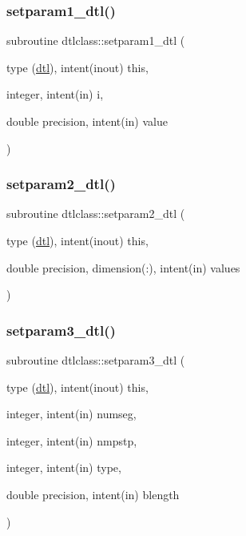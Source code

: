 \subsubsection{\texorpdfstring{setparam1\_dtl()}{setparam1\_dtl()}}
{\footnotesize\ttfamily subroutine dtlclass\+::setparam1\+\_\+dtl (\begin{DoxyParamCaption}\item[{type (\mbox{\hyperlink{namespacedtlclass_structdtlclass_1_1dtl}{dtl}}), intent(inout)}]{this,  }\item[{integer, intent(in)}]{i,  }\item[{double precision, intent(in)}]{value }\end{DoxyParamCaption})}

\mbox{\label{namespacedtlclass_a267abecac3bfad96fd1ce717ba50c8b4}} 
\subsubsection{\texorpdfstring{setparam2\_dtl()}{setparam2\_dtl()}}
{\footnotesize\ttfamily subroutine dtlclass\+::setparam2\+\_\+dtl (\begin{DoxyParamCaption}\item[{type (\mbox{\hyperlink{namespacedtlclass_structdtlclass_1_1dtl}{dtl}}), intent(inout)}]{this,  }\item[{double precision, dimension(\+:), intent(in)}]{values }\end{DoxyParamCaption})}

\mbox{\label{namespacedtlclass_aaccb0362c1862fd4f4e34a23f1bb25b9}} 
\subsubsection{\texorpdfstring{setparam3\_dtl()}{setparam3\_dtl()}}
{\footnotesize\ttfamily subroutine dtlclass\+::setparam3\+\_\+dtl (\begin{DoxyParamCaption}\item[{type (\mbox{\hyperlink{namespacedtlclass_structdtlclass_1_1dtl}{dtl}}), intent(inout)}]{this,  }\item[{integer, intent(in)}]{numseg,  }\item[{integer, intent(in)}]{nmpstp,  }\item[{integer, intent(in)}]{type,  }\item[{double precision, intent(in)}]{blength }\end{DoxyParamCaption})}



